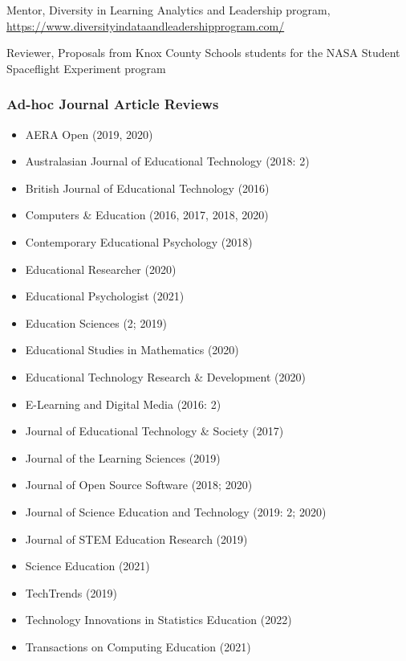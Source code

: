 \documentclass[
  14,
]{article}
\providecommand{\tightlist}{%
  \setlength{\itemsep}{0pt}\setlength{\parskip}{0pt}}
\begin{document}
Mentor, Diversity in Learning Analytics and Leadership program,
\url{https://www.diversityindataandleadershipprogram.com/}

Reviewer, Proposals from Knox County Schools students for the NASA
Student Spaceflight Experiment program

\hypertarget{ad-hoc-journal-article-reviews}{%
\subsubsection{Ad-hoc Journal Article
Reviews}\label{ad-hoc-journal-article-reviews}}

\begin{itemize}
\tightlist
\item
  AERA Open (2019, 2020)\\
\item
  Australasian Journal of Educational Technology (2018: 2)\\
\item
  British Journal of Educational Technology (2016)\\
\item
  Computers \& Education (2016, 2017, 2018, 2020)\\
\item
  Contemporary Educational Psychology (2018)\\
\item
  Educational Researcher (2020)\\
\item
  Educational Psychologist (2021)\\
\item
  Education Sciences (2; 2019)\\
\item
  Educational Studies in Mathematics (2020)\\
\item
  Educational Technology Research \& Development (2020)\\
\item
  E-Learning and Digital Media (2016: 2)\\
\item
  Journal of Educational Technology \& Society (2017)\\
\item
  Journal of the Learning Sciences (2019)\\
\item
  Journal of Open Source Software (2018; 2020)\\
\item
  Journal of Science Education and Technology (2019: 2; 2020)\\
\item
  Journal of STEM Education Research (2019)\\
\item
  Science Education (2021)\\
\item
  TechTrends (2019)\\
\item
  Technology Innovations in Statistics Education (2022)\\
\item
  Transactions on Computing Education (2021)
\end{itemize}
\end{document}
